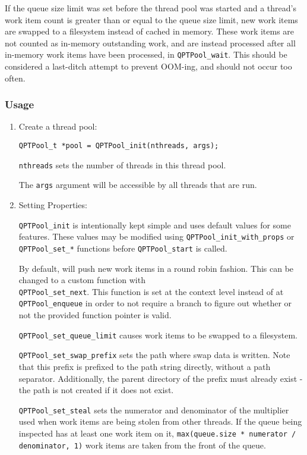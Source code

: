 If the queue size limit was set before the thread pool was started and
a thread's work item count is greater than or equal to the queue size
limit, new work items are swapped to a filesystem instead of cached in
memory. These work items are not counted as in-memory outstanding
work, and are instead processed after all in-memory work items have
been processed, in \texttt{QPTPool\_wait}. This should be considered a
last-ditch attempt to prevent OOM-ing, and should not occur too often.

\subsubsection{Usage}
\begin{enumerate}
\item Create a thread pool:

  \texttt{QPTPool\_t *pool = QPTPool\_init(nthreads, args);}

  \texttt{nthreads} sets the number of threads in this thread
  pool.

  The \texttt{args} argument will be accessible by all threads that
  are run.

\item Setting Properties:

  \texttt{QPTPool\_init} is intentionally kept simple and uses default
  values for some features. These values may be modified using
  \texttt{QPTPool\_init\_with\_props} or \texttt{QPTPool\_set\_*}
  functions before \texttt{QPTPool\_start} is called.

  By default, \qptp will push new work items in a round robin
  fashion. This can be changed to a custom function with
  \\\texttt{QPTPool\_set\_next}. This function is set at the context
  level instead of at \texttt{QPTPool\_enqueue} in order to not
  require a branch to figure out whether or not the provided function
  pointer is valid.

  \texttt{QPTPool\_set\_queue\_limit} causes work items to be swapped
  to a filesystem.

  \texttt{QPTPool\_set\_swap\_prefix} sets the path where swap data is
  written. Note that this prefix is prefixed to the path string
  directly, without a path separator. Additionally, the parent
  directory of the prefix must already exist - the path is not created
  if it does not exist.

  \texttt{QPTPool\_set\_steal} sets the numerator and denominator of
  the multiplier used when work items are being stolen from other
  threads. If the queue being inspected has at least one work item on
  it, \texttt{max(queue.size * numerator / denominator, 1)} work items
  are taken from the front of the queue.


\end{enumerate}
